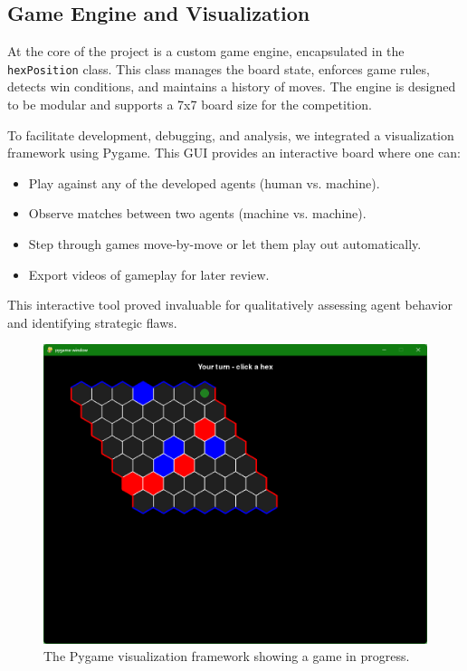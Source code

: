 \documentclass[conference]{IEEEtran}
\begin{document}
\subsection{Game Engine and Visualization}
At the core of the project is a custom game engine, encapsulated in the \texttt{hexPosition} class. This class manages the board state, enforces game rules, detects win conditions, and maintains a history of moves. The engine is designed to be modular and supports a 7x7 board size for the competition.

To facilitate development, debugging, and analysis, we integrated a visualization framework using Pygame. This GUI provides an interactive board where one can:
\begin{itemize}
    \item Play against any of the developed agents (human vs. machine).
    \item Observe matches between two agents (machine vs. machine).
    \item Step through games move-by-move or let them play out automatically.
    \item Export videos of gameplay for later review.
\end{itemize}
This interactive tool proved invaluable for qualitatively assessing agent behavior and identifying strategic flaws.

\begin{figure}[htbp]
\centerline{\includegraphics[width=0.8\columnwidth]{hex-pygame.png}}
\caption{The Pygame visualization framework showing a game in progress.}
\label{fig:gui}
\end{figure}
\end{document}
